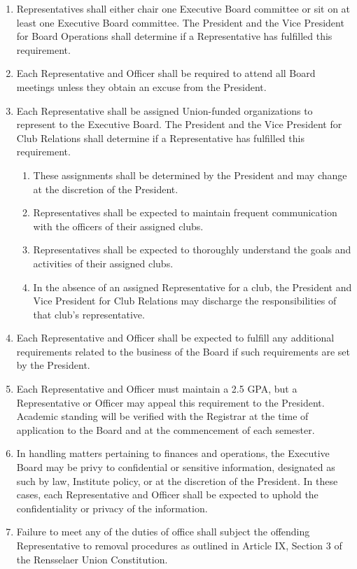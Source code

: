 \begin{enumerate}
\item Representatives shall either chair one Executive Board committee or sit on at least one Executive Board committee. The President and the Vice President for Board Operations shall determine if a Representative has fulfilled this requirement.
\item Each Representative and Officer shall be required to attend all Board meetings unless they obtain an excuse from the President.
\item Each Representative shall be assigned Union-funded organizations to represent to the Executive Board. The President and the Vice President for Club Relations shall determine if a Representative has fulfilled this requirement.
  \begin{enumerate}
  \item These assignments shall be determined by the President and may change at the discretion of the President.
  \item Representatives shall be expected to maintain frequent communication with the officers of their assigned clubs.
  \item Representatives shall be expected to thoroughly understand the goals and activities of their assigned clubs.
  \item In the absence of an assigned Representative for a club, the President and Vice President for Club Relations may discharge the responsibilities of that club’s representative.
  \end{enumerate}
\item Each Representative and Officer shall be expected to fulfill any additional requirements related to the business of the Board if such requirements are set by the President.
\item Each Representative and Officer must maintain a 2.5 GPA, but a Representative or Officer may appeal this requirement to the President. Academic standing will be verified with the Registrar at the time of application to the Board and at the commencement of each semester.
\item In handling matters pertaining to finances and operations, the Executive Board may be privy to confidential or sensitive information, designated as such by law, Institute policy, or at the discretion of the President. In these cases, each Representative and Officer shall be expected to uphold the confidentiality or privacy of the information.
\item Failure to meet any of the duties of office shall subject the offending Representative to removal procedures as outlined in Article IX, Section 3 of the Rensselaer Union Constitution.
\end{enumerate}


